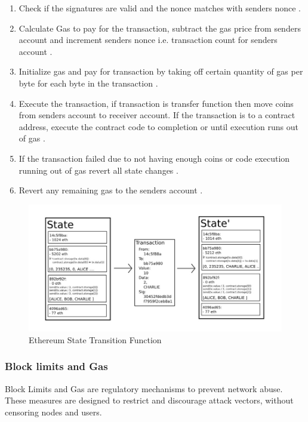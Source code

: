 \begin{enumerate}
\item Check if the signatures are valid and the nonce matches with senders nonce \cite{eth:001}.
\item Calculate Gas to pay for the transaction, subtract the gas price from senders account and increment senders nonce i.e. transaction count for senders account \cite{eth:001}.
\item Initialize gas and pay for transaction by taking off certain quantity of gas per byte for each byte in the transaction \cite{eth:001}.
\item Execute the transaction, if transaction is transfer function then move coins from senders account to receiver account. If the transaction is to a contract address, execute the contract code to completion or until execution runs out of gas \cite{eth:001}.
\item If the transaction failed due to not having enough coins or code execution running out of gas revert all state changes \cite{eth:001}.
\item Revert any remaining gas to the senders account \cite{eth:001}.
\end{enumerate}

\begin{figure}[h]
	\centering
    \includegraphics[width=180mm,scale=1]{figs/ethstf}
	\caption{Ethereum State Transition Function \cite{eth:001}}
	\label{fig:EthSTF}
\end{figure}
\clearpage
\subsubsection{Block limits and Gas} \label{trxprice} 
Block Limits and Gas are regulatory mechanisms to prevent network abuse. These measures are designed to restrict and discourage attack vectors, without censoring nodes and users. 
 
